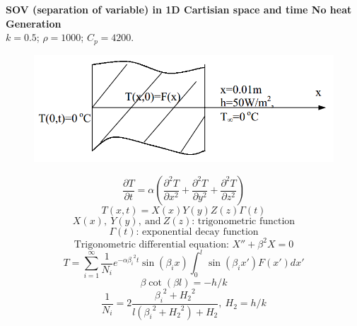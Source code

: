 \begin{example}
\textbf{ SOV (separation of variable) in 1D Cartisian space and time
No heat Generation}\\
$k = 0.5$; $\rho=1000$; $C_p = 4200$.
\begin{figure}[H]
  \centering
    \includegraphics[scale=0.5]{figures/appendixA/5}
\end{figure}

$$\frac{\partial T}{\partial t}=
\alpha\left(\frac{\partial^2 T}{\partial x^2}+
\frac{\partial^2 T}{\partial y^2}+
\frac{\partial^2 T}{\partial z^2}\right)$$
$$T(x,t)=X(x)Y(y)Z(z)\Gamma(t)$$
$$X(x),~Y(y),~\text{and} ~Z(z)\text{: trigonometric function}$$
$$\Gamma(t)\text{: exponential decay function}$$
$$\text{Trigonometric differential equation: }X''+\beta^2X=0$$
$$T=\sum_{i=1}^{\infty} \frac{1}{N_i}e^{-\alpha{\beta_i}^2t}\sin{(\beta_i x)}\int_0^{l}\sin{(\beta_i x')}F(x')dx'$$
$$\beta\cot{(\beta l)}=-h/k$$
$$\frac{1}{N_i}=2\frac{{\beta_i}^2+{H_2}^2}{l({\beta_i}^2+{H_2}^2)+H_2},
~H_2=h/k$$
\end{example}

